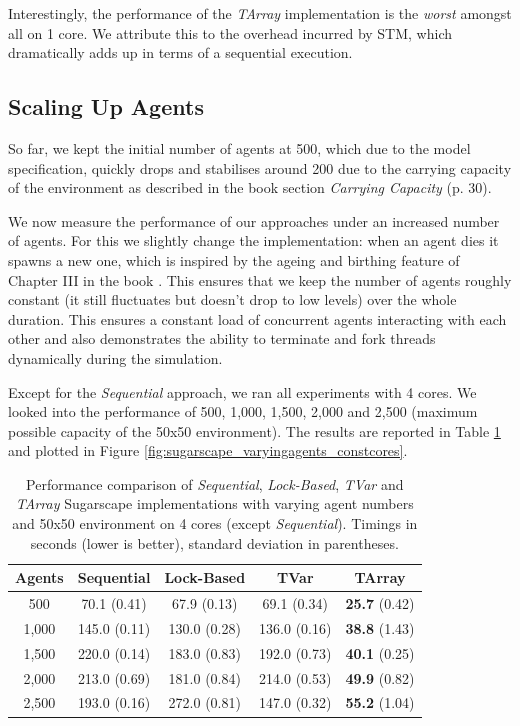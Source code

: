 Interestingly, the performance of the \textit{TArray} implementation is the \textit{worst} amongst all on 1 core. We attribute this to the overhead incurred by STM, which dramatically adds up in terms of a sequential execution.

\subsection{Scaling Up Agents}
So far, we kept the initial number of agents at 500, which due to the model specification, quickly drops and stabilises around 200 due to the carrying capacity of the environment as described in the book \cite{epstein_growing_1996} section \textit{Carrying Capacity} (p. 30).

We now measure the performance of our approaches under an increased number of agents. For this we slightly change the implementation: when an agent dies it spawns a new one, which is inspired by the ageing and birthing feature of Chapter III in the book \cite{epstein_growing_1996}. This ensures that we keep the number of agents roughly constant (it still fluctuates but doesn't drop to low levels) over the whole duration. This ensures a constant load of concurrent agents interacting with each other and also demonstrates the ability to terminate and fork threads dynamically during the simulation.

Except for the \textit{Sequential} approach, we ran all experiments with 4 cores. We looked into the performance of 500, 1,000, 1,500, 2,000 and 2,500 (maximum possible capacity of the 50x50 environment). The results are reported in Table \ref{tab:sugarscape_varyingagents_constcores} and plotted in Figure \ref{fig:sugarscape_varyingagents_constcores}.

\begin{table}
	\centering
  	\begin{tabular}{ c || c | c | c | c }
        Agents  & Sequential    & Lock-Based    & TVar          & TArray                \\ \hline \hline 
    	    500     & 70.1 (0.41)   & 67.9 (0.13)   & 69.1 (0.34)   & \textbf{25.7} (0.42)  \\ \hline
   		1,000   & 145.0 (0.11)  & 130.0 (0.28)  & 136.0 (0.16)  & \textbf{38.8} (1.43)  \\ \hline
   		1,500   & 220.0 (0.14)  & 183.0 (0.83)  & 192.0 (0.73)  & \textbf{40.1} (0.25)  \\ \hline
   		2,000   & 213.0 (0.69)  & 181.0 (0.84)  & 214.0 (0.53)  & \textbf{49.9} (0.82)  \\ \hline
   		2,500   & 193.0 (0.16)  & 272.0 (0.81)  & 147.0 (0.32)  & \textbf{55.2} (1.04)  \\ \hline \hline
   	\end{tabular}
  	
  	\caption{Performance comparison of \textit{Sequential}, \textit{Lock-Based}, \textit{TVar} and \textit{TArray} Sugarscape implementations with varying agent numbers and 50x50 environment on 4 cores (except \textit{Sequential}). Timings in seconds (lower is better), standard deviation in parentheses.}
	\label{tab:sugarscape_varyingagents_constcores}
\end{table}

